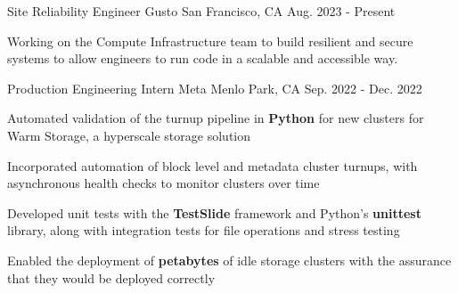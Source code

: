 

\begin{cventries}

\cventry
{Site Reliability Engineer} %
{Gusto} %
{San Francisco, CA} %
{Aug. 2023 - Present} %
{
  \begin{cvitems} %
    \item{Working on the Compute Infrastructure team to build resilient and secure systems to allow engineers to run code in a scalable and accessible way.}
  \end{cvitems}
}

\cventry
{Production Engineering Intern} %
{Meta} %
{Menlo Park, CA} %
{Sep. 2022 - Dec. 2022} %
{
  \begin{cvitems} %
    \item {Automated validation of the turnup pipeline in \textbf{Python} for new clusters for Warm Storage, a hyperscale storage solution}
    \item {Incorporated automation of block level and metadata cluster turnups, with asynchronous health checks to monitor clusters over time}
    \item {Developed unit tests with the \textbf{TestSlide} framework and Python's \textbf{unittest} library, along with integration tests for file operations and stress testing}
    \item {Enabled the deployment of \textbf{petabytes} of idle storage clusters with the assurance that they would be deployed correctly}
  \end{cvitems}
}


\end{cventries}
